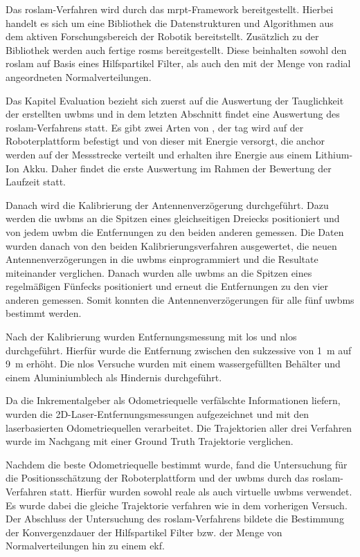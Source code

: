 Das \gls{roslam}-Verfahren wird durch das \gls{mrpt}-Framework bereitgestellt. Hierbei handelt es sich um eine Bibliothek die Datenstrukturen und Algorithmen aus dem aktiven Forschungsbereich der Robotik bereitstellt. Zusätzlich zu der Bibliothek werden auch fertige \glspl{rosm} bereitgestellt. Diese beinhalten sowohl den  \gls{roslam} auf Basis eines Hilfspartikel Filter, als auch den mit der Menge von radial angeordneten Normalverteilungen.

Das Kapitel Evaluation bezieht sich zuerst auf die Auswertung der Tauglichkeit der erstellten \glspl{uwbm} und in dem letzten Abschnitt findet eine Auswertung des \gls{roslam}-Ver\-fah\-rens statt. Es gibt zwei Arten von , der \gls{tag} wird auf der Roboterplattform befestigt und von dieser mit Energie versorgt, die \gls{anchor} werden auf der Messstrecke verteilt und erhalten ihre Energie aus einem Lithium-Ion Akku. Daher findet die erste Auswertung im Rahmen der Bewertung der Laufzeit statt.

Danach wird die Kalibrierung der Antennenverzögerung durchgeführt. Dazu werden die \glspl{uwbm} an die Spitzen eines gleichseitigen Dreiecks positioniert und von jedem \gls{uwbm} die Entfernungen zu den beiden anderen  gemessen. Die Daten wurden danach von den beiden Kalibrierungsverfahren ausgewertet, die neuen Antennenverzögerungen in die \glspl{uwbm} einprogrammiert und die Resultate miteinander verglichen. Danach wurden alle \glspl{uwbm} an die  Spitzen eines regelmäßigen Fünfecks positioniert und erneut die Entfernungen zu den vier anderen  gemessen. Somit konnten die Antennenverzögerungen für alle fünf \glspl{uwbm} bestimmt werden.

Nach der Kalibrierung wurden Entfernungsmessung mit \gls{los} und \gls{nlos} durchgeführt. Hierfür wurde die Entfernung zwischen den  sukzessive von \SI{1}{\meter} auf \SI{9}{\meter} erhöht. Die \gls{nlos} Versuche wurden mit einem wassergefüllten Behälter und einem Aluminiumblech als Hindernis durchgeführt.

Da die Inkrementalgeber als Odometriequelle verfälschte Informationen liefern, wurden die 2D-Laser-Entfernungsmessungen aufgezeichnet und mit den laserbasierten Odometriequellen verarbeitet. Die Trajektorien aller drei Verfahren wurde im Nachgang mit einer Ground Truth Trajektorie verglichen.

Nachdem die beste Odometriequelle bestimmt wurde, fand die Untersuchung für die Positionsschätzung der Roboterplattform und der \glspl{uwbm} durch das \gls{roslam}-Verfahren statt. Hierfür wurden sowohl reale als auch virtuelle \glspl{uwbm} verwendet. Es wurde dabei die gleiche Trajektorie verfahren wie in dem vorherigen Versuch. Der Abschluss der Untersuchung des \gls{roslam}-Verfahrens bildete die Bestimmung der Konvergenzdauer der Hilfspartikel Filter bzw. der Menge von Normalverteilungen hin zu einem \gls{ekf}.


